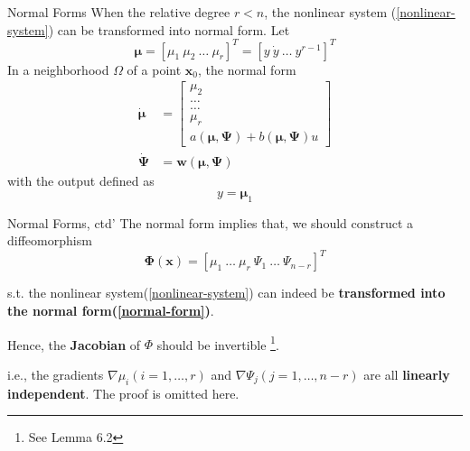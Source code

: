 \documentclass{beamer}
\renewcommand{\vec}[1]{\ensuremath{\boldsymbol{#1}}} %
\begin{document}
\begin{frame}{Normal Forms}
    When the relative degree {\color{red}$r<n$}, the nonlinear system (\ref{nonlinear-system}) can be transformed into {\color{red}normal form}. Let
    \begin{equation}\label{translate-state}
      \vec{\mu}=\left[\mu_{1}~\mu_{2}~\dots~\mu_{r}\right]^{T}=\left[y~\dot{y}~\dots~y^{r-1} \right]^{T}
    \end{equation}
    In a neighborhood $\Omega$ of a point $\vec{x}_{0}$, the normal form
    \begin{equation}\label{normal-form}
    \begin{aligned}
      \dot{\vec{\mu}} &= \left[\begin{matrix}
                                \mu_{2} \\
                                \dots \\
                                \dots \\
                                \mu_{r} \\
                                a(\vec{\mu}, \vec{\Psi})+b(\vec{\mu}, \vec{\Psi})u
                              \end{matrix}\right] \\
      \dot{\vec{\Psi}} &= \vec{w}(\vec{\mu}, \vec{\Psi})
    \end{aligned}
    \end{equation}
    with the output defined as
    \begin{equation}\label{normal-form-output}
      y=\vec{\mu}_{1}
    \end{equation}
\end{frame}


\begin{frame}{Normal Forms, ctd'}
    The normal form implies that, we should construct a {\color{red}diffeomorphism}
    \begin{equation}\label{diffeomorphism}
      \vec{\Phi}(\vec{x}) = \left[ \mu_{1}~\dots~\mu_{r}~\Psi_{1}~\dots~\Psi_{n-r} \right]^{T}
    \end{equation}

    s.t. the nonlinear system(\ref{nonlinear-system}) can indeed be \textbf{transformed into the normal form(\ref{normal-form})}.

    Hence, the \textbf{Jacobian} of $\Phi$ should be invertible \footnote{See Lemma 6.2}.

    i.e., the gradients $\nabla \mu_{i}(i=1, \dots, r)$ and $\nabla \Psi_{j}(j=1, \dots, n-r)$ are all \textbf{linearly independent}. The proof is omitted here.
\end{frame}
\end{document}

